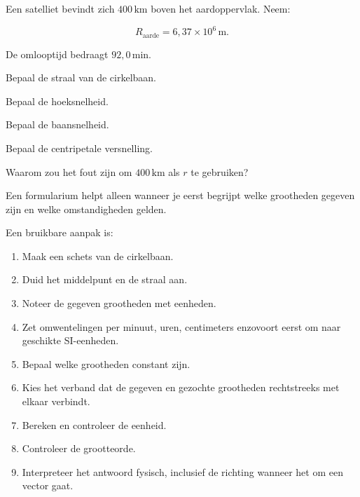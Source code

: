 \documentclass{ximera}
\begin{document}
\begin{oefening}{\oefU\ESS}

Een satelliet bevindt zich $400\,\mathrm{km}$ boven het aardoppervlak.
Neem:

\[
R_{\mathrm{aarde}}=6,37\times10^6\,\mathrm{m}.
\]

De omlooptijd bedraagt $92,0\,\mathrm{min}$.

\begin{question}
Bepaal de straal van de cirkelbaan.
\end{question}

\begin{question}
Bepaal de hoeksnelheid.
\end{question}

\begin{question}
Bepaal de baansnelheid.
\end{question}

\begin{question}
Bepaal de centripetale versnelling.
\end{question}

\begin{question}
Waarom zou het fout zijn om $400\,\mathrm{km}$ als $r$ te gebruiken?
\end{question}

\end{oefening}




Een formularium helpt alleen wanneer je eerst begrijpt welke grootheden
gegeven zijn en welke omstandigheden gelden.

Een bruikbare aanpak is:

\begin{enumerate}
  \item Maak een schets van de cirkelbaan.
  \item Duid het middelpunt en de straal aan.
  \item Noteer de gegeven grootheden met eenheden.
  \item Zet omwentelingen per minuut, uren, centimeters enzovoort eerst
        om naar geschikte SI-eenheden.
  \item Bepaal welke grootheden constant zijn.
  \item Kies het verband dat de gegeven en gezochte grootheden rechtstreeks
        met elkaar verbindt.
  \item Bereken en controleer de eenheid.
  \item Controleer de grootteorde.
  \item Interpreteer het antwoord fysisch, inclusief de richting wanneer
        het om een vector gaat.
\end{enumerate}
\end{document}
